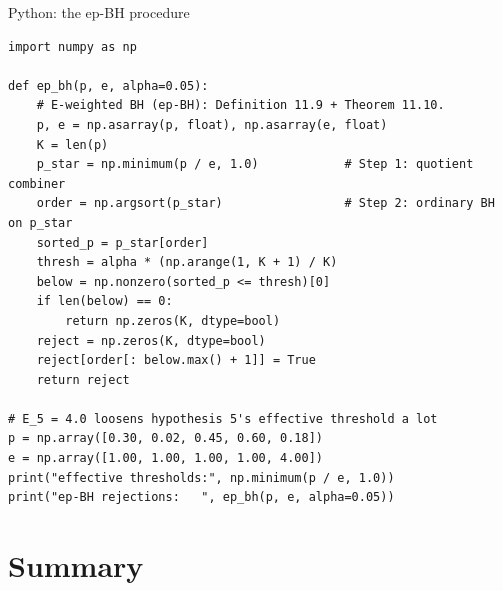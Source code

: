 \documentclass[aspectratio=169,10pt]{beamer}
\newcommand{\1}{\mathbb{1}}
\begin{document}
\begin{frame}[fragile]{Python: the ep-BH procedure}

\begin{lstlisting}
import numpy as np

def ep_bh(p, e, alpha=0.05):
    # E-weighted BH (ep-BH): Definition 11.9 + Theorem 11.10.
    p, e = np.asarray(p, float), np.asarray(e, float)
    K = len(p)
    p_star = np.minimum(p / e, 1.0)            # Step 1: quotient combiner
    order = np.argsort(p_star)                 # Step 2: ordinary BH on p_star
    sorted_p = p_star[order]
    thresh = alpha * (np.arange(1, K + 1) / K)
    below = np.nonzero(sorted_p <= thresh)[0]
    if len(below) == 0:
        return np.zeros(K, dtype=bool)
    reject = np.zeros(K, dtype=bool)
    reject[order[: below.max() + 1]] = True
    return reject

# E_5 = 4.0 loosens hypothesis 5's effective threshold a lot
p = np.array([0.30, 0.02, 0.45, 0.60, 0.18])
e = np.array([1.00, 1.00, 1.00, 1.00, 4.00])
print("effective thresholds:", np.minimum(p / e, 1.0))
print("ep-BH rejections:   ", ep_bh(p, e, alpha=0.05))
\end{lstlisting}

\end{frame}

\section{Summary}
\end{document}
